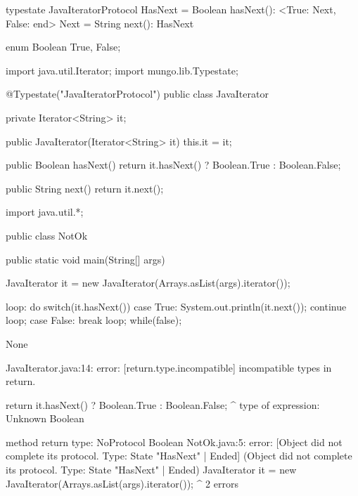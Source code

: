 \begin{code}
typestate JavaIteratorProtocol {
  HasNext = {
    Boolean hasNext(): <True: Next, False: end>
  }
  Next = {
    String next(): HasNext
  }
}\end{code}

\begin{code}
enum Boolean {
	True, False;
}\end{code}

\begin{code}
import java.util.Iterator;
import mungo.lib.Typestate;

@Typestate("JavaIteratorProtocol")
public class JavaIterator {

  private Iterator<String> it;

  public JavaIterator(Iterator<String> it) {
    this.it = it;
  }

	public Boolean hasNext() {
    return it.hasNext() ? Boolean.True : Boolean.False;
  }

  public String next() {
    return it.next();
  }

}\end{code}

\begin{code}
import java.util.*;

public class NotOk {
	public static void main(String[] args) {
		JavaIterator it = new JavaIterator(Arrays.asList(args).iterator());

    loop: do {
      switch(it.hasNext()) {
        case True:
          System.out.println(it.next());
          continue loop;
        case False:
          break loop;
      }
    } while(false);
	}
}\end{code}

\lstset{language=,caption=Mungo's output}
\begin{code}
None
\end{code}

\lstset{language=,caption=Our tool's output}
\begin{code}
JavaIterator.java:14: error: [return.type.incompatible] incompatible types in return.

    return it.hasNext() ? Boolean.True : Boolean.False;
                        ^
  type of expression: Unknown Boolean

  method return type: NoProtocol Boolean
NotOk.java:5: error: [Object did not complete its protocol. Type: State "HasNext" | Ended] (Object did not complete its protocol. Type: State "HasNext" | Ended)
		JavaIterator it = new JavaIterator(Arrays.asList(args).iterator());
		             ^
2 errors
\end{code}

